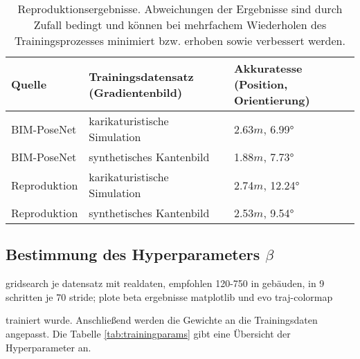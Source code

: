 \begin{table}[H]
	\centering
	\caption{Reproduktionsergebnisse. Abweichungen der Ergebnisse sind durch Zufall bedingt und können bei mehrfachem Wiederholen des Trainingsprozesses minimiert bzw. erhoben sowie verbessert werden. }
	\begin{tabularx}{1.0\textwidth}{>{\hsize=0.7\hsize}X >{\hsize=1.3\hsize}X X}
		\textbf{Quelle} & \textbf{Trainingsdatensatz} \hspace{2cm} (Gradientenbild)& \textbf{Akkuratesse} \hspace{2cm} (Position, Orientierung)\\
		\hline
		BIM-PoseNet & karikaturistische Simulation & 2.63$m$, 6.99°\\
		\hline
		BIM-PoseNet & synthetisches Kantenbild & 1.88$m$, 7.73°\\
		\hline
		Reproduktion & karikaturistische Simulation & 2.74$m$, 12.24°\\
		\hline
		Reproduktion & synthetisches Kantenbild & 2.53$m$, 9.54°\\
	\end{tabularx}
	\label{tab:reproduction}
\end{table}



\subsection{Bestimmung des Hyperparameters $\beta$}
\label{subsec:determine_beta}
gridsearch je datensatz mit realdaten, empfohlen 120-750 in gebäuden, in 9 schritten je 70 stride; plote beta ergebnisse matplotlib und evo traj-colormap

\cite{zhouLearningDeepFeatures2014} trainiert wurde. Anschließend werden die Gewichte an die Trainingsdaten angepasst. Die Tabelle \ref{tab:trainingparams} gibt eine Übersicht der Hyperparameter an.

